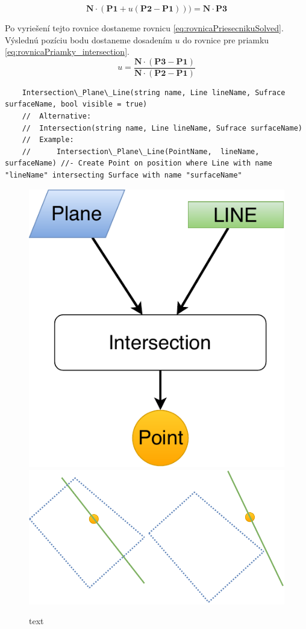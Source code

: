 \begin{equation}
	\textbf{N} \cdot (\textbf{P1}+u(\textbf{P2}-\textbf{P1}))) = \textbf{N} \cdot \textbf{P3}
    \label{eq:rovnicaPriesecniku}
\end{equation}

Po vyriešení tejto rovnice dostaneme rovnicu \ref{eq:rovnicaPriesecnikuSolved}. Výslednú pozíciu bodu dostaneme dosadením $u$ do rovnice pre  priamku \ref{eq:rovnicaPriamky_intersection}.
\begin{equation}
	u=\frac
{\textbf{N} \cdot (\textbf{P3}-\textbf{P1})}
{\textbf{N} \cdot (\textbf{P2}-\textbf{P1})}
    \label{eq:rovnicaPriesecnikuSolved}
\end{equation}


\begin{lstlisting}
	Intersection\_Plane\_Line(string name, Line lineName, Sufrace surfaceName, bool visible = true)
	//	Alternative:
	//	Intersection(string name, Line lineName, Sufrace surfaceName)
	//	Example:
	//		Intersection\_Plane\_Line(PointName,  lineName, surfaceName) //- Create Point on position where Line with name "lineName" intersecting Surface with name "surfaceName"

\end{lstlisting}

\begin{figure}[H]
	\centering
	\includegraphics[height=0.3\textwidth]{obrazky-figures/Diagram/DP Navrh operacii-0D - PointIntersection PlaneLine.pdf}
	\includegraphics[height=0.3\textwidth]{obrazky-figures/Diagram/Draw/1Points/DP Navrh operacii-0D - PointIntersectionPlaneLine.pdf}
	\caption{text}
	\label{fig:GraphIntersection_Plane_Line}
\end{figure}

